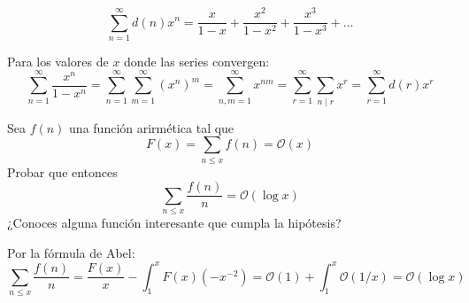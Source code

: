 \documentclass[twoside]{article}
\providecommand{\bo}[1]{\mathcal{O}\left(#1\right)}
\begin{document}
\newpage

\begin{ejercicio}{2}
\[ \sum_{n=1}^{∞} d(n)x^n = \frac{x}{1-x} + \frac{x^2}{1-x^2} + \frac{x^3}{1-x^3} + \dots \]
\end{ejercicio}
\begin{solucion}
Para los valores de $x$ donde las series convergen:
\[ \sum_{n=1}^{∞} \frac{x^n}{1-x^n} = \sum_{n=1}^{∞} \sum_{m=1}^{∞} (x^n)^m = \sum_{n,m=1}^{∞} x^{nm} = \sum_{r=1}^{∞} \sum_{n\mid r} x^r = \sum_{r=1}^{∞} d(r)x^r\]
\end{solucion}

\newpage

\begin{ejercicio}{3}
Sea $f(n)$ una función arirmética tal que
\[ F(x) = \sum_{n≤x} f(n) = \mathcal{O}(x) \]
Probar que entonces
\[ \sum_{n≤x} \frac{f(n)}{n} = \bo{\log x} \]
¿Conoces alguna función interesante que cumpla la hipótesis?
\end{ejercicio}
\begin{solucion}
Por la fórmula de Abel:
\[ \sum_{n≤x} \frac{f(n)}{n} = \frac{F(x)}{x} - \int_1^x F(x)\left(-x^{-2}\right) = \bo{1} + \int_1^x \bo{1/x} = \bo{\log x} \]
\end{solucion}
\end{document}
